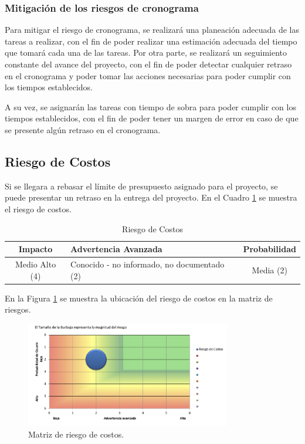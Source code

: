 \subsubsection{Mitigación de los riesgos de cronograma}

Para mitigar el riesgo de cronograma, se realizará una planeación adecuada de
las tareas a realizar, con el fin de poder realizar una estimación adecuada del
tiempo que tomará cada una de las tareas. Por otra parte, se realizará un
seguimiento constante del avance del proyecto, con el fin de poder detectar
cualquier retraso en el cronograma y poder tomar las acciones necesarias para
poder cumplir con los tiempos establecidos.

A su vez, se asignarán las tareas con tiempo de sobra para poder cumplir con
los tiempos establecidos, con el fin de poder tener un margen de error en caso
de que se presente algún retraso en el cronograma.

\subsection{Riesgo de Costos}

Si se llegara a rebasar el límite de presupuesto asignado para el proyecto, se
puede presentar un retraso en la entrega del proyecto. En el Cuadro
\ref{table:riesgo_costos} se muestra el riesgo de costos.

\begin{table}[H]
\centering
\begin{tabular}{|c|p{5cm}|c|}
\hline
\rowcolor{azulclaro}
  \centering\textbf{Impacto} & \centering\textbf{Advertencia Avanzada}\arraybackslash & \centering\textbf{Probabilidad}\arraybackslash \\
\hline
  Medio Alto (4) & Conocido - no informado, no documentado (2) & Media (2) \\
\hline
\end{tabular}
\caption{Riesgo de Costos}
\label{table:riesgo_costos}
\end{table}

En la Figura \ref{fig:riesgo_costos} se muestra la ubicación del riesgo de
costos en la matriz de riesgos.

\begin{figure}[H]
  \centering
  \includegraphics[width=0.8\textwidth]{imagenes/03-analisis/analisis-riesgos/riesgo-costos.png}
  \caption{Matriz de riesgo de costos.}
  \label{fig:riesgo_costos}
\end{figure}

